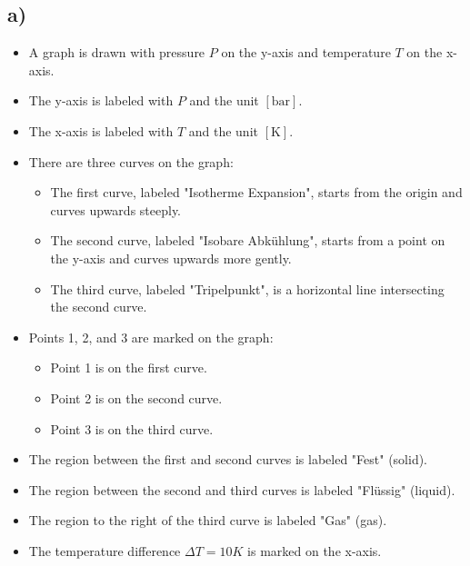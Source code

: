 

\subsection*{a)}

\begin{itemize}
    \item A graph is drawn with pressure \( P \) on the y-axis and temperature \( T \) on the x-axis.
    \item The y-axis is labeled with \( P \) and the unit \([ \text{bar} ]\).
    \item The x-axis is labeled with \( T \) and the unit \([ \text{K} ]\).
    \item There are three curves on the graph:
    \begin{itemize}
        \item The first curve, labeled "Isotherme Expansion", starts from the origin and curves upwards steeply.
        \item The second curve, labeled "Isobare Abkühlung", starts from a point on the y-axis and curves upwards more gently.
        \item The third curve, labeled "Tripelpunkt", is a horizontal line intersecting the second curve.
    \end{itemize}
    \item Points 1, 2, and 3 are marked on the graph:
    \begin{itemize}
        \item Point 1 is on the first curve.
        \item Point 2 is on the second curve.
        \item Point 3 is on the third curve.
    \end{itemize}
    \item The region between the first and second curves is labeled "Fest" (solid).
    \item The region between the second and third curves is labeled "Flüssig" (liquid).
    \item The region to the right of the third curve is labeled "Gas" (gas).
    \item The temperature difference \(\Delta T = 10K\) is marked on the x-axis.
\end{itemize}